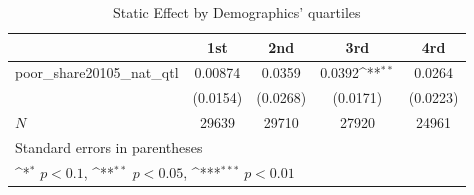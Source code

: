 \begin{table}[htbp]\centering
\def\sym#1{\ifmmode^{#1}\else\(^{#1}\)\fi}
\caption{Static Effect by Demographics' quartiles}
\begin{tabular}{l*{4}{c}}
\hline\hline
            &\multicolumn{1}{c}{1st}&\multicolumn{1}{c}{2nd}&\multicolumn{1}{c}{3rd}&\multicolumn{1}{c}{4rd}\\
\hline
poor\_share20105\_nat\_qtl&     0.00874         &      0.0359         &      0.0392\sym{**} &      0.0264         \\
            &    (0.0154)         &    (0.0268)         &    (0.0171)         &    (0.0223)         \\
\hline
\(N\)       &       29639         &       29710         &       27920         &       24961         \\
\hline\hline
\multicolumn{5}{l}{\footnotesize Standard errors in parentheses}\\
\multicolumn{5}{l}{\footnotesize \sym{*} \(p<0.1\), \sym{**} \(p<0.05\), \sym{***} \(p<0.01\)}\\
\end{tabular}
\end{table}
